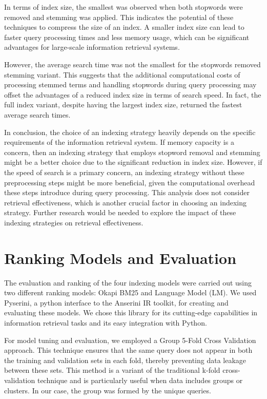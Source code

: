 \documentclass[11pt,a4paper]{article}
\begin{document}
In terms of index size, the smallest was observed when both stopwords
were removed and stemming was applied. This indicates the potential
of these techniques to compress the size of an index. A smaller index
size can lead to faster query processing times and less memory usage,
which can be significant advantages for large-scale information
retrieval systems.

However, the average search time was not the smallest for the
stopwords removed stemming variant. This suggests that the additional
computational costs of processing stemmed terms and handling
stopwords during query processing may offset the advantages of a
reduced index size in terms of search speed. In fact, the full index
variant, despite having the largest index size, returned the fastest
average search times.

In conclusion, the choice of an indexing strategy heavily depends on
the specific requirements of the information retrieval system. If
memory capacity is a concern, then an indexing strategy that employs
stopword removal and stemming might be a better choice due to the
significant reduction in index size. However, if the speed of search
is a primary concern, an indexing strategy without these
preprocessing steps might be more beneficial, given the computational
overhead these steps introduce during query processing. This analysis
does not consider retrieval effectiveness, which is another crucial
factor in choosing an indexing strategy. Further research would be
needed to explore the impact of these indexing strategies on
retrieval effectiveness.

\section{Ranking Models and Evaluation}

The evaluation and ranking of the four indexing models were carried
out using two different ranking models: Okapi BM25 and Language Model
(LM). We used Pyserini, a python interface to the Anserini IR
toolkit, for creating and evaluating these models. We chose this
library for its cutting-edge capabilities in information retrieval
tasks and its easy integration with Python.

For model tuning and evaluation, we employed a Group 5-Fold Cross
Validation approach. This technique ensures that the same query does
not appear in both the training and validation sets in each fold,
thereby preventing data leakage between these sets. This method is a
variant of the traditional k-fold cross-validation technique and is
particularly useful when data includes groups or clusters. In our
case, the group was formed by the unique queries.
\end{document}
